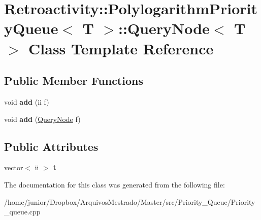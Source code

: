 \hypertarget{classRetroactivity_1_1PolylogarithmPriorityQueue_1_1QueryNode}{}\section{Retroactivity\+:\+:Polylogarithm\+Priority\+Queue$<$ T $>$\+:\+:Query\+Node$<$ T $>$ Class Template Reference}
\label{classRetroactivity_1_1PolylogarithmPriorityQueue_1_1QueryNode}
\subsection*{Public Member Functions}
\begin{DoxyCompactItemize}
\item 
\mbox{\label{classRetroactivity_1_1PolylogarithmPriorityQueue_1_1QueryNode_aa7ee4d66e9cc7b44339ec3ec2e233ca4}} 
void {\bfseries add} (ii f)
\item 
\mbox{\label{classRetroactivity_1_1PolylogarithmPriorityQueue_1_1QueryNode_abd6979482d644e2b4c78fbf2abfe1786}} 
void {\bfseries add} (\hyperlink{classRetroactivity_1_1PolylogarithmPriorityQueue_1_1QueryNode}{Query\+Node} f)
\end{DoxyCompactItemize}
\subsection*{Public Attributes}
\begin{DoxyCompactItemize}
\item 
\mbox{\label{classRetroactivity_1_1PolylogarithmPriorityQueue_1_1QueryNode_a56ae351907978caa05b9d87c71be03cd}} 
vector$<$ ii $>$ {\bfseries t}
\end{DoxyCompactItemize}


The documentation for this class was generated from the following file\+:\begin{DoxyCompactItemize}
\item 
/home/junior/\+Dropbox/\+Arquivos\+Mestrado/\+Master/src/\+Priority\+\_\+\+Queue/Priority\+\_\+queue.\+cpp\end{DoxyCompactItemize}
